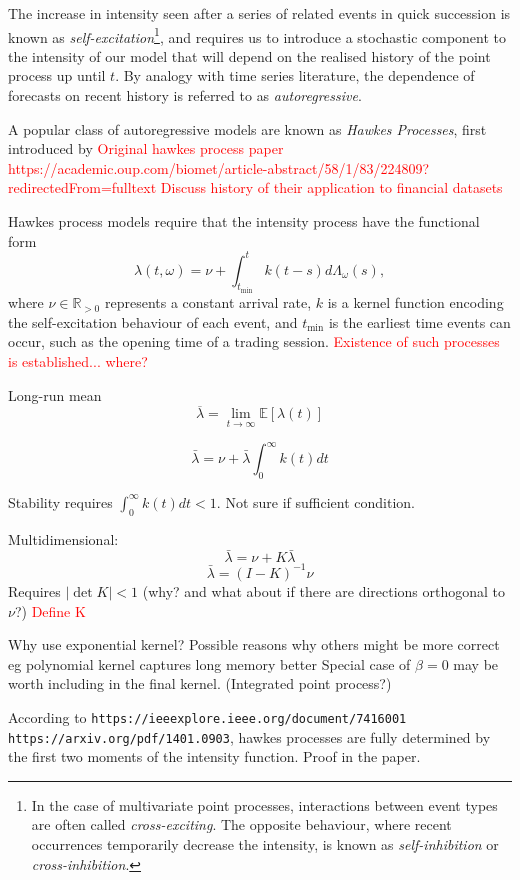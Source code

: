 \documentclass[honours,12pt]{unswthesis}
\numberwithin{equation}{section}
\begin{document}
The increase in intensity seen after a series of related events in quick succession is known as \textit{self-excitation}\footnote{In the case of multivariate point processes, interactions between event types are often called \textit{cross-exciting}. The opposite behaviour, where recent occurrences temporarily decrease the intensity, is known as \textit{self-inhibition} or \textit{cross-inhibition}.}, and requires us to introduce a stochastic component to the intensity of our model that will depend on the realised history of the point process up until $t$. By analogy with time series literature, the dependence of forecasts on recent history is referred to as \textit{autoregressive}.

A popular class of autoregressive models are known as \textit{Hawkes Processes}, first introduced by 
\textcolor{red}{Original hawkes process paper https://academic.oup.com/biomet/article-abstract/58/1/83/224809?redirectedFrom=fulltext}
\textcolor{red}{Discuss history of their application to financial datasets}

Hawkes process models require that the intensity process have the functional form
$$\lambda(t,\omega) = \nu + \int_{t_\mathrm{\min}}^t k(t-s)d\Lambda_\omega(s),$$
where $\nu\in\mathbb{R}_{>0}$ represents a constant arrival rate, $k$ is a kernel function encoding the self-excitation behaviour of each event, and $t_\mathrm{\min}$ is the earliest time events can occur, such as the opening time of a trading session.
\textcolor{red}{Existence of such processes is established... where?}

Long-run mean $$\overline\lambda = \lim_{t\to\infty} \mathbb E\left[\lambda(t)\right]$$

$$\bar\lambda = \nu + \bar\lambda \int_0^\infty k(t)dt$$

Stability requires $\int_0^\infty k(t)dt < 1$. Not sure if sufficient condition.

Multidimensional:
$$\bar\lambda = \nu + K \bar\lambda$$
$$\bar\lambda = (I-K)^{-1}\nu$$
Requires $\vert\det K\vert < 1$ (why? and what about if there are directions orthogonal to $\nu$?)
\textcolor{red}{Define K}

Why use exponential kernel? Possible reasons why others might be more correct eg polynomial kernel captures long memory better
Special case of $\beta=0$ may be worth including in the final kernel. (Integrated point process?)

According to \texttt{https://ieeexplore.ieee.org/document/7416001 https://arxiv.org/pdf/1401.0903}, hawkes processes are fully determined by the first two moments of the intensity function. Proof in the paper.
\end{document}
